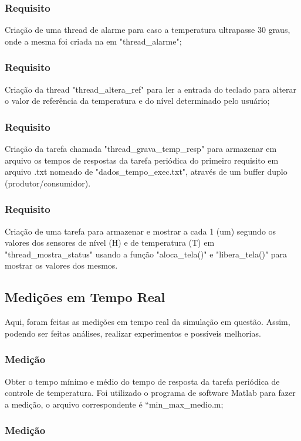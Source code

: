 \documentclass[journal]{IEEEtran}
\begin{document}
\subsubsection{Requisito}Criação de uma thread de alarme para caso a temperatura ultrapasse 30 graus, onde a mesma foi criada na em "thread\_alarme";

\subsubsection{Requisito}Criação da thread "thread\_altera\_ref" para ler a entrada do teclado para alterar o valor de referência da temperatura e do nível determinado pelo usuário;

\subsubsection{Requisito}Criação da tarefa chamada "thread\_grava\_temp\_resp" para armazenar em arquivo os tempos de respostas da tarefa periódica do primeiro requisito em arquivo .txt nomeado de "dados\_tempo\_exec.txt", através de um buffer duplo (produtor/consumidor).

\subsubsection{Requisito}Criação de uma tarefa para armazenar e mostrar a cada 1 (um) segundo os valores dos sensores de nível (H) e de temperatura (T) em "thread\_mostra\_status" usando a função "aloca\_tela()" e "libera\_tela()" para mostrar os valores dos mesmos.

\subsection{Medições em Tempo Real}

Aqui, foram feitas as medições em tempo real da simulação em questão. Assim, podendo ser feitas análises, realizar experimentos e possíveis melhorias.

\subsubsection{Medição}

Obter o tempo mínimo e médio do tempo de resposta da tarefa periódica de controle de temperatura. Foi utilizado o programa de software Matlab para fazer a medição, o arquivo correspondente é “min\_max\_medio.m;

\subsubsection{Medição}
\end{document}
